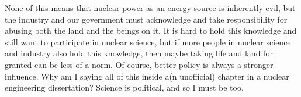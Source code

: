 {None of this means that nuclear power as an energy source is inherently evil,
but the industry and our government must acknowledge and take responsibility
for abusing both the land and the beings on it. It is hard to hold this
knowledge and still want to participate in nuclear science, but if more people
in nuclear science and industry also hold this knowledge, then maybe taking
life and land for granted can be less of a norm. Of course, better policy is
always a stronger influence. Why am I saying all of this inside a(n unofficial)
chapter in a nuclear engineering dissertation? Science is political, and so I
must be too.  

}
